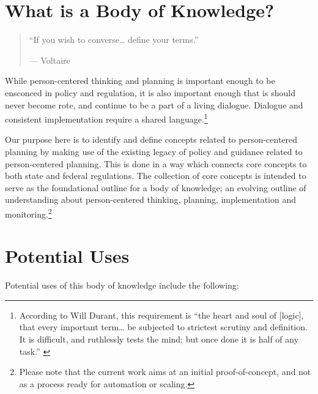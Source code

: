 \documentclass[
]{book}
\begin{document}
\hypertarget{what-is-a-body-of-knowledge}{%
\section{What is a Body of Knowledge?}\label{what-is-a-body-of-knowledge}}

\begin{quote}
``If you wish to converse\ldots{} define your terms.''

--- Voltaire
\end{quote}

While person-centered thinking and planning is important enough to be ensconced in policy and regulation, it is also important enough that is should never become rote, and continue to be a part of a living dialogue. Dialogue and consistent implementation require a shared language.\footnote{According to Will Durant, this requirement is ``the heart and soul of {[}logic{]}, that every important term\ldots{} be subjected to strictest scrutiny and definition. It is difficult, and ruthlessly tests the mind; but once done it is half of any task.'' \citet{durant}}

Our purpose here is to identify and define concepts related to person-centered planning by making use of the existing legacy of policy and guidance related to person-centered planning. This is done in a way which connects core concepts to both state and federal regulations. The collection of core concepts is intended to serve as the foundational outline for a body of knowledge; an evolving outline of understanding about person-centered thinking, planning, implementation and monitoring.\footnote{Please note that the current work aims at an initial proof-of-concept, and not as a process ready for automation or scaling.}

\hypertarget{potential-uses}{%
\section{Potential Uses}\label{potential-uses}}

Potential uses of this body of knowledge include the following:
\end{document}

